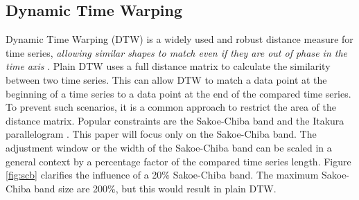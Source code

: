 \subsection{Dynamic Time Warping} \label{dynamic_time_warping}
Dynamic Time Warping (DTW) is a widely used and robust distance measure for time series, \textit{allowing similar shapes
to match even if they are out of phase in the time axis} \cite{keogh2002exact}. Plain DTW uses a full distance matrix to
calculate the similarity between two time series. This can allow DTW to match a data point at the beginning of a time series to a
data point at the end of the compared time series. To prevent such scenarios, it is a common approach to restrict the
area of the distance matrix. Popular constraints are the Sakoe-Chiba band \cite{sakoe1978dynamic} and the Itakura
parallelogram \cite{itakura1975minimum}. This paper will focus only on the Sakoe-Chiba band. The adjustment window or
the width of the Sakoe-Chiba band can be scaled in a general context by a percentage factor of the compared time series
length. Figure \ref{fig:scb} clarifies the influence of a 20\% Sakoe-Chiba band. The maximum Sakoe-Chiba band size are
200\%, but this would result in plain DTW.

